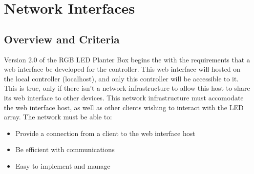 \documentclass[onecolumn, draftclsnofoot,10pt, compsoc]{IEEEtran}
\begin{document}
\newpage

\tableofcontents
\clearpage
\singlespace

\newpage





	\section{Network Interfaces}

		\subsection{Overview and Criteria}
		Version 2.0 of the RGB LED Planter Box begins the with the requirements that a web interface be developed for the controller.
		This web interface will hosted on the local controller (localhost), and only this controller will be accessible to it.
		This is true, only if there isn't a network infrastructure to allow this host to share its web interface to other devices.
	  This network infrastructure must accomodate the web interface host, as well as other clients wishing to interact with the LED array.
		The network must be able to:

		\begin{itemize}
			\item Provide a connection from a client to the web interface host
			\item Be efficient with communications
			\item Easy to implement and manage
		\end{itemize}
\end{document}
